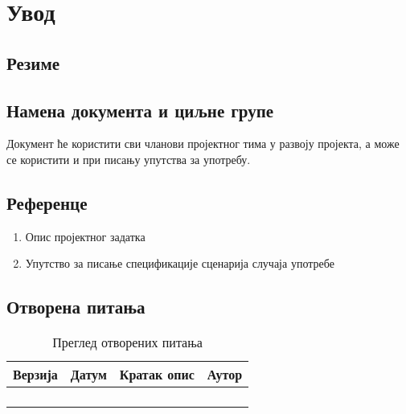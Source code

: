 \section{Увод}

\subsection{Резиме}

\subsection{Намена документа и циљне групе}
Документ ће користити сви чланови пројектног тима у развоју пројекта, а може се 
користити и при писању упутства за употребу.

\subsection{Референце}
\begin{enumerate}
	\item Опис пројектног задатка
	\item Упутство за писање спецификације сценарија случаја употребе
\end{enumerate}

\subsection{Отворена питања}
\begin{table}[h!]
\centering
	
	\begin{tabu}{ || X[l] | X[l] | X[l] | X[l] || }
	\hline
	\textbf{Верзија} & \textbf{Датум} & \textbf{Кратак опис} & \textbf{Аутор} \\
	\hline
	\hline
	& & &\\
	\hline
	& & &\\
	\hline
	& & &\\
	\hline
	& & &\\
	\hline
	\end{tabu}
	\caption{Преглед отворених питања}
	\label{table:2}
		
\end{table}
